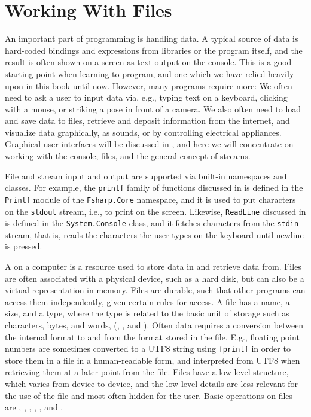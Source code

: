 \documentclass[fsharpnotes.tex]{subfiles}
\begin{document}
\chapter{Working With Files}
\label{chap:IO}
An important part of programming is handling data. A typical source of data is hard-coded bindings and expressions from libraries or the program itself, and the result is often shown on a screen as text output on the console. This is a good starting point when learning to program, and one which we have relied heavily upon in this book until now. However, many programs require more: We often need to ask a user to input data via, e.g., typing text on a keyboard, clicking with a mouse, or striking a pose in front of a camera. We also often need to load and save data to files, retrieve and deposit information from the internet, and visualize data graphically, as sounds, or by controlling electrical appliances. Graphical user interfaces will be discussed in , and here we will concentrate on working with the console, files, and the general concept of streams.

File and stream input and output are supported via built-in namespaces and classes. For example, the \lstinline!printf! family of functions discussed in  is defined in the \lstinline!Printf! module of the \lstinline!Fsharp.Core! namespace, and it is used to put characters on the \lstinline{stdout} stream, i.e., to print on the screen. Likewise, \lstinline{ReadLine} discussed in  is defined in the \lstinline{System.Console} class, and it fetches characters from the \lstinline{stdin} stream, that is, reads the characters the user types on the keyboard until newline is pressed.

A  on a computer is a resource used to store data in and retrieve data from. Files are often associated with a physical device, such as a hard disk, but can also be a virtual representation in memory. Files are durable, such that other programs can access them independently, given certain rules for access. A file has a name, a size, and a type, where the type is related to the basic unit of storage such as characters, bytes, and words, (, , and ). Often data requires a conversion between the internal format to and from the format stored in the file. E.g., floating point numbers are sometimes converted to a UTF8 string using \lstinline!fprintf! in order to store them in a file in a human-readable form, and interpreted from UTF8 when retrieving them at a later point from the file. Files have a low-level structure, which varies from device to device, and the low-level details are less relevant for the use of the file and most often hidden for the user. Basic operations on files are , , , , , and .
\end{document}
